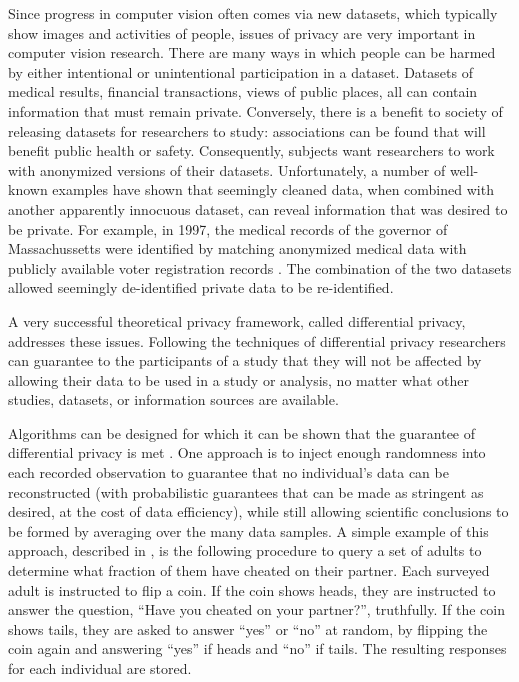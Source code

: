 Since progress in computer vision often comes via new datasets, which typically show images and activities of people, issues of privacy are very important in computer vision research.  There are many ways in which people can be harmed by either intentional or unintentional participation in a dataset.  Datasets of medical results, financial transactions, views of public places, all can contain information that must remain private.
Conversely, there is a benefit to society of releasing datasets for researchers to study:  associations can be found that will benefit public health or safety.  Consequently, subjects want researchers to work with anonymized versions of their datasets.  Unfortunately, a number of well-known examples have shown that seemingly cleaned data, when combined with another apparently innocuous dataset, can reveal information that was desired to be private.  For example, in 1997, the medical records of the governor of Massachussetts were identified by matching anonymized medical
data with publicly available voter registration records \cite{Kearns2020,Dwork2014}.
The combination of the two datasets allowed seemingly de-identified private data to be re-identified.


A very successful theoretical privacy framework, called differential privacy, addresses these issues.
Following the techniques of differential privacy \cite{Dwork2014}  researchers can guarantee to the participants of a study that they will not be affected by allowing their data to be used in a study or analysis,
no matter what other studies, datasets, or information sources are available.


Algorithms can be designed for which it can be shown that the guarantee of differential privacy is met
\cite{Kearns2020,Dwork2014}.  One approach is to inject enough randomness into each recorded observation to guarantee that no individual's data can be reconstructed (with probabilistic guarantees that can be made as stringent as desired, at the cost of data efficiency), while still allowing scientific conclusions to be formed by averaging over the many data samples.
A simple example of this approach, described in \cite{Kearns2020}, is the following procedure to query a set of adults to determine what fraction of them have cheated on their partner.  Each surveyed adult is instructed to flip a coin.  If the coin shows heads, they are instructed to answer the question, ``Have you cheated on your partner?'',  truthfully.  If the coin shows tails, they are asked to answer ``yes'' or ``no'' at random, by flipping the coin again and answering ``yes'' if heads and ``no'' if tails.  The resulting responses for each individual are stored.



